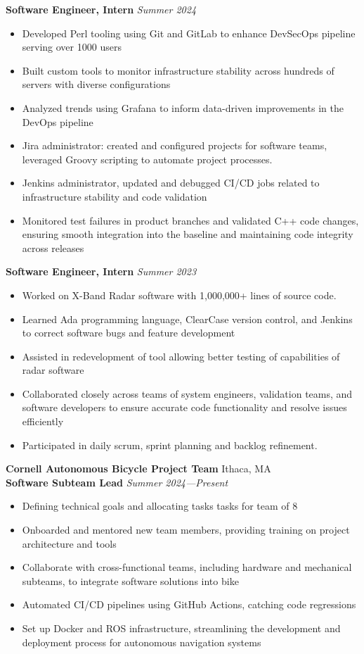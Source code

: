 \documentclass[letterpaper,10pt]{article}
\newcommand{\company}[2]{
    \vspace{6pt}
    \large \textbf{#1}
    \hfill
    {\small {#2}}
    \\
}
\newcommand{\position}[2]{
    \vspace{4pt}
    \normalsize \textbf {#1}
    \hfill {\small \textit{#2}}
    \\
}
\newcommand{\itemsBegin}{
    \begin{itemize}[leftmargin=0.2in, labelsep=0.05in, itemsep=0pt, parsep=1pt, topsep=0pt, partopsep=0pt]
}
\newcommand{\itemsEnd}{\end{itemize}}
\begin{document}
    \position{Software Engineer, Intern}{Summer 2024}
    \itemsBegin{}
        \item Developed Perl tooling using Git and GitLab to enhance DevSecOps pipeline serving over 1000 users
        \item Built custom tools to monitor infrastructure stability across hundreds of servers with diverse configurations
        \item Analyzed trends using Grafana to inform data-driven improvements in the DevOps pipeline
        \item Jira administrator: created and configured projects for software teams, leveraged Groovy scripting to automate project processes.
        \item Jenkins administrator, updated and debugged CI/CD jobs related to infrastructure stability and code validation
        \item Monitored test failures in product branches and validated C++ code changes, ensuring smooth integration into the baseline and maintaining code integrity across releases
    \itemsEnd{}

    \position{Software Engineer, Intern}{Summer 2023}
    \itemsBegin{}
        \item Worked on X-Band Radar software with 1,000,000+ lines of source code.
        \item Learned Ada programming language, ClearCase version control, and Jenkins to correct software bugs and feature development
        \item Assisted in redevelopment of tool allowing better testing of capabilities of radar software
        \item Collaborated closely across teams of system engineers, validation teams, and software developers to ensure accurate code functionality and resolve issues efficiently
        \item Participated in daily scrum, sprint planning and backlog refinement.
    \itemsEnd{}

    \company{Cornell Autonomous Bicycle Project Team}{Ithaca, MA}

    \position{Software Subteam Lead}{Summer 2024---Present}
    \itemsBegin{}
        \item Defining technical goals and allocating tasks tasks for team of 8
        \item Onboarded and mentored new team members, providing training on project architecture and tools
        \item Collaborate with cross-functional teams, including hardware and mechanical subteams, to integrate software solutions into bike
        \item Automated CI/CD pipelines using GitHub Actions, catching code regressions
        \item Set up Docker and ROS infrastructure, streamlining the development and deployment process for autonomous navigation systems
    \itemsEnd{}
\end{document}
